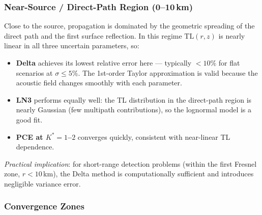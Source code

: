 \documentclass[11pt,a4paper]{article}
\begin{document}
\subsubsection{Near-Source / Direct-Path Region (0--10\,km)}

Close to the source, propagation is dominated by the geometric spreading of the direct path
and the first surface reflection.
In this regime $\mathrm{TL}(r,z)$ is nearly linear in all three uncertain parameters, so:
\begin{itemize}
  \item \textbf{Delta} achieves its lowest relative error here --- typically $< 10\%$ for
        flat scenarios at $\sigma \leq 5\%$.
        The 1st-order Taylor approximation is valid because the acoustic field changes smoothly
        with each parameter.
  \item \textbf{LN3} performs equally well: the TL distribution in the direct-path region is
        nearly Gaussian (few multipath contributions), so the lognormal model is a good fit.
  \item \textbf{PCE at $K^* = 1$--$2$} converges quickly, consistent with near-linear TL
        dependence.
\end{itemize}
\emph{Practical implication}: for short-range detection problems (within the first Fresnel
zone, $r < 10$\,km), the Delta method is computationally sufficient and introduces
negligible variance error.

\subsubsection{Convergence Zones}
\end{document}
